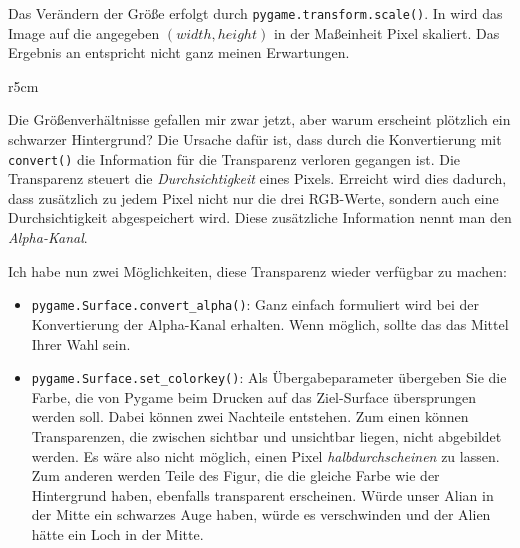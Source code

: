 Das Verändern der Größe erfolgt durch \texttt{pygame.transform.scale()}. In  wird das Image auf die angegeben $(width, height)$ in der Maßeinheit Pixel skaliert. Das Ergebnis an  entspricht nicht ganz meinen Erwartungen.  

\begin{wrapfigure}[9]{r}{5cm}
    \vspace{-1em}
\end{wrapfigure}
\label{pageTransparenz}Die Größenverhältnisse gefallen mir zwar jetzt, aber warum erscheint plötzlich ein schwarzer Hintergrund? Die Ursache dafür ist, dass durch die Konvertierung mit \texttt{convert()} die Information für die Transparenz verloren gegangen ist. Die Transparenz steuert die \emph{Durchsichtigkeit} eines Pixels. Erreicht wird dies dadurch, dass zusätzlich zu jedem Pixel nicht nur die drei RGB-Werte, sondern auch eine Durchsichtigkeit abgespeichert wird. Diese zusätzliche Information nennt man den \emph{Alpha-Kanal}.

Ich habe nun zwei Möglichkeiten, diese Transparenz wieder verfügbar zu machen:
\begin{itemize}
	\item \texttt{pygame.Surface.convert\_alpha()}: Ganz einfach formuliert wird bei der Konvertierung der Alpha-Kanal erhalten. Wenn möglich, sollte das das Mittel Ihrer Wahl sein.
	
	\item \texttt{pygame.Surface.set\_colorkey()}: Als Übergabeparameter übergeben Sie die Farbe, die von Pygame beim Drucken auf das Ziel-Surface übersprungen werden soll. Dabei können zwei Nachteile entstehen. Zum einen können Transparenzen, die zwischen sichtbar und unsichtbar liegen, nicht abgebildet werden. Es wäre also nicht möglich, einen Pixel \emph{halbdurchscheinen} zu lassen. Zum anderen werden Teile des Figur, die die gleiche Farbe wie der Hintergrund haben, ebenfalls transparent erscheinen. Würde unser Alian in der Mitte ein schwarzes Auge haben, würde es verschwinden und der Alien hätte ein Loch in der Mitte.
\end{itemize}



